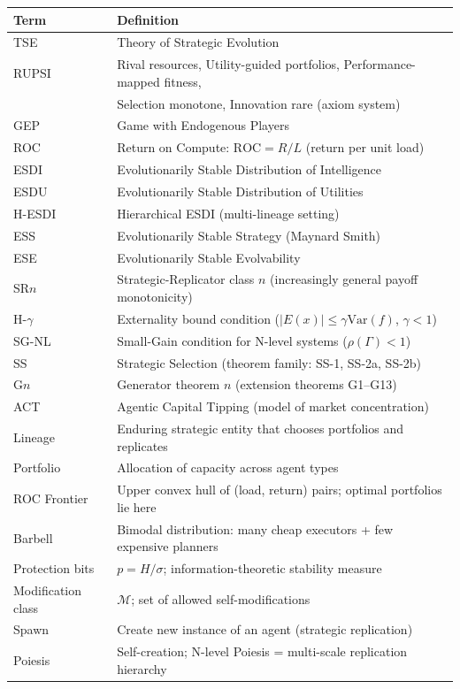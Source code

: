 \documentclass[12pt]{article}
\newcommand{\ROC}{\mathrm{ROC}}
\newcommand{\Var}{\mathrm{Var}}
\begin{document}
\begin{tabular}{ll}
\toprule
\textbf{Term} & \textbf{Definition} \\
\midrule
TSE & Theory of Strategic Evolution \\
RUPSI & Rival resources, Utility-guided portfolios, Performance-mapped fitness, \\
& Selection monotone, Innovation rare (axiom system) \\
GEP & Game with Endogenous Players \\
ROC & Return on Compute: $\ROC = R/L$ (return per unit load) \\
ESDI & Evolutionarily Stable Distribution of Intelligence \\
ESDU & Evolutionarily Stable Distribution of Utilities \\
H-ESDI & Hierarchical ESDI (multi-lineage setting) \\
ESS & Evolutionarily Stable Strategy (Maynard Smith) \\
ESE & Evolutionarily Stable Evolvability \\
\midrule
SR$n$ & Strategic-Replicator class $n$ (increasingly general payoff monotonicity) \\
H-$\gamma$ & Externality bound condition ($|E(x)| \leq \gamma \Var(f)$, $\gamma < 1$) \\
SG-NL & Small-Gain condition for N-level systems ($\rho(\Gamma) < 1$) \\
SS & Strategic Selection (theorem family: SS-1, SS-2a, SS-2b) \\
G$n$ & Generator theorem $n$ (extension theorems G1--G13) \\
ACT & Agentic Capital Tipping (model of market concentration) \\
\midrule
Lineage & Enduring strategic entity that chooses portfolios and replicates \\
Portfolio & Allocation of capacity across agent types \\
ROC Frontier & Upper convex hull of (load, return) pairs; optimal portfolios lie here \\
Barbell & Bimodal distribution: many cheap executors + few expensive planners \\
Protection bits & $p = H/\sigma$; information-theoretic stability measure \\
Modification class & $\mathcal{M}$; set of allowed self-modifications \\
Spawn & Create new instance of an agent (strategic replication) \\
Poiesis & Self-creation; N-level Poiesis = multi-scale replication hierarchy \\
\bottomrule
\end{tabular}
\end{document}
